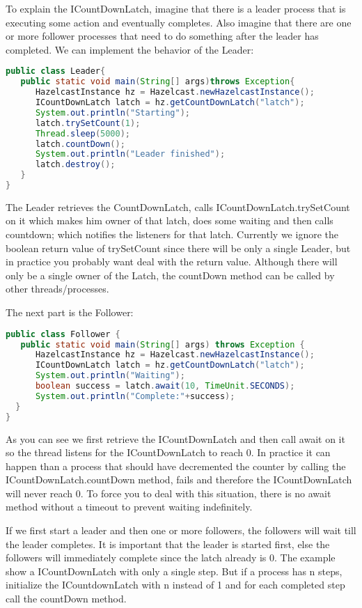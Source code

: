 To explain the ICountDownLatch, imagine that there is a leader process that is executing some action and eventually completes. Also imagine that there are one or more follower processes that need to do something after the leader has completed. We can implement the behavior of the Leader:
\begin{lstlisting}[language=java]
public class Leader{
   public static void main(String[] args)throws Exception{
      HazelcastInstance hz = Hazelcast.newHazelcastInstance();
      ICountDownLatch latch = hz.getCountDownLatch("latch");      
      System.out.println("Starting");
      latch.trySetCount(1); 
      Thread.sleep(5000);
      latch.countDown();
      System.out.println("Leader finished");
      latch.destroy();
   }
}
\end{lstlisting}
The Leader retrieves the CountDownLatch, calls ICountDownLatch.trySetCount on it which makes him owner of that latch, does some waiting and then calls countdown; which notifies the listeners for that latch. Currently we ignore the boolean return value of trySetCount since there will be only a single Leader, but in practice you probably want deal with the return value. Although there will only be a single owner of the Latch, the countDown method can be called by other threads/processes.

The next part is the Follower:
\begin{lstlisting}[language=java]
public class Follower {
   public static void main(String[] args) throws Exception {
      HazelcastInstance hz = Hazelcast.newHazelcastInstance();
      ICountDownLatch latch = hz.getCountDownLatch("latch");
      System.out.println("Waiting");
      boolean success = latch.await(10, TimeUnit.SECONDS);
      System.out.println("Complete:"+success);
  }
}
\end{lstlisting}
As you can see we first retrieve the ICountDownLatch and then call await on it so the thread listens for the ICountDownLatch to reach 0. In practice it can happen than a process that should have decremented the counter by calling the ICountDownLatch.countDown method, fails and therefore the ICountDownLatch will never reach 0. To force you to deal with this situation, there is no await method without a timeout to prevent waiting indefinitely. 

If we first start a leader and then one or more followers, the followers will wait till the leader completes. It is important that the leader is started first, else the followers will immediately complete since the latch already is 0. The example show a ICountDownLatch with only a single step. But if a process has n steps, initialize the ICountdownLatch with n instead of 1 and for each completed step call the countDown method.

